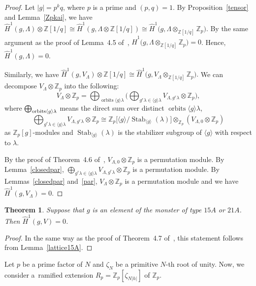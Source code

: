 \documentclass[pdftex]{sigma}%
\numberwithin{equation}{section}
\newtheorem{Theorem}{Theorem}[section]
\begin{document}
\begin{proof}
Let $|g|=p^kq$, where $p$ is a prime and $(p,q)=1$. By Proposition~\ref{tensor} and Lemma~\ref{Zpkai}, we have $\hat{H}^1(g,\Lambda)\otimes \mathbb{Z}[1/q]\cong \hat{H}^1(g,\Lambda \otimes \mathbb{Z}[1/q])\cong \hat{H}^1\big(g,\Lambda \otimes_{\mathbb{Z}[1/q]}\mathbb{Z}_p\big)$. By the same argument as the proof of Lemma~4.5 of~\cite{BR}, $\hat{H}^1\big(g,\Lambda \otimes_{\mathbb{Z}[1/q]}\mathbb{Z}_p\big)=0$. Hence, $\hat{H}^1(g,\Lambda)=0$.

Similarly, we have $\hat{H}^1(g,V_\Lambda)\otimes \mathbb{Z}[1/q]\cong \hat{H}^1\big(g,V_\Lambda \otimes_{\mathbb{Z}[1/q]}\mathbb{Z}_p\big).$ We can decompose $V_\Lambda \otimes \mathbb{Z}_p$ into the following:
\[
V_\Lambda \otimes \mathbb{Z}_p=\bigoplus_{\operatorname{orbits} \langle g \rangle \lambda}\bigg( \bigoplus_{g^r\lambda \in \langle g \rangle \lambda} V_{\Lambda ,g^r\lambda}\otimes \mathbb{Z}_p \bigg),
\]
where $\bigoplus_{{{\rm orbits} \langle g \rangle \lambda}}$ means the direct sum over distinct $\operatorname{orbits} \langle g \rangle \lambda$,
\[
\bigoplus_{g^r\lambda \in \langle g \rangle \lambda}V_{\Lambda,g^r\lambda}\otimes \mathbb{Z}_p\cong \mathbb{Z}_p\lbrack \langle g\rangle /\operatorname{Stab}_{\langle g \rangle}(\lambda)\rbrack \otimes_{\mathbb{Z}_p} (V_{\Lambda,0}\otimes \mathbb{Z}_p)
\]
 as $\mathbb{Z}_p[g]$-modules and $\operatorname{Stab}_{\langle g \rangle}(\lambda)$ is the stabilizer subgroup of $\langle g \rangle$ with respect to $\lambda$.

By the proof of Theorem~4.6 of~\cite{BR}, $V_{\Lambda,0}\otimes \mathbb{Z}_p$ is a permutation module. By Lemma~\ref{closedpar}, $\bigoplus_{g^r\lambda \in \langle g \rangle \lambda} V_{\Lambda ,g^r\lambda}\otimes \mathbb{Z}_p$ is a permutation module. By Lemmas~\ref{closedpar} and~\ref{par}, $V_\Lambda \otimes \mathbb{Z}_p$ is a permutation module and we have $\hat{H}^1(g,V_\Lambda)=0$.
\end{proof}

\begin{Theorem}\label{15A21A}
Suppose that $g$ is an element of the monster of type $15A$ or $21A$. Then $\hat{H}^1(g,V)=0$.
\end{Theorem}

\begin{proof}
In the same way as the proof of Theorem~4.7 of~\cite{BR}, this statement follows from Lemma~\ref{lattice15A}.
\end{proof}

Let $p$ be a prime factor of $N$ and $\zeta_N$ be a primitive $N$-th root of unity. Now, we consider a~ramified extension $R_p=\mathbb{Z}_p[\zeta_{N|h|}]$ of $\mathbb{Z}_p$.
\end{document}
